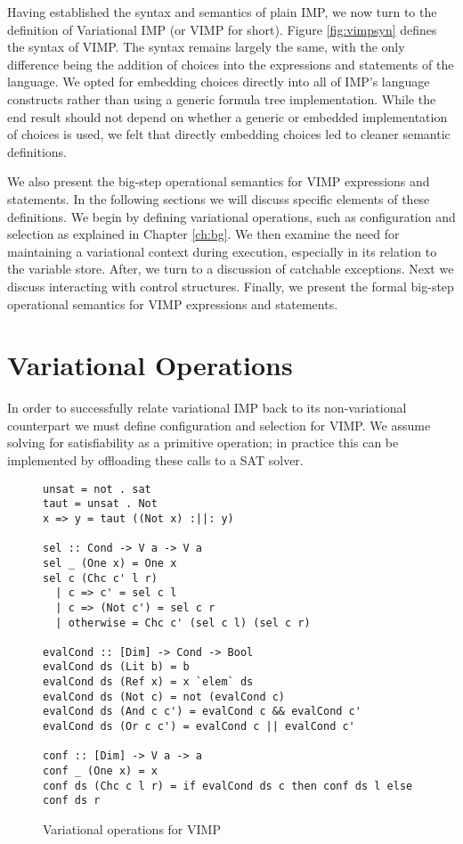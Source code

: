 \documentclass[12pt,oneside]{book}
\begin{document}
Having established the syntax and semantics of plain IMP, we now turn to the definition of Variational IMP (or VIMP for short).
Figure \ref{fig:vimpsyn} defines the syntax of VIMP. The syntax remains largely the same, with the only difference being the
addition of choices into the expressions and statements of the language. We opted for embedding choices directly into all of IMP's language constructs rather than using
a generic formula tree implementation. While the end result should not depend on whether a generic or embedded implementation of choices is
used, we felt that directly embedding choices led to cleaner semantic definitions.

We also present the big-step operational semantics for VIMP expressions and statements. In the following sections we will discuss specific elements of these definitions.
We begin by defining variational operations, such as configuration and selection as explained in Chapter \ref{ch:bg}. We then examine the need for maintaining a variational context during execution, especially in its relation to the variable store. After, we turn to a discussion of
catchable exceptions. Next we discuss interacting with control structures. Finally, we present the formal big-step operational semantics for VIMP expressions and statements.




\section{Variational Operations}

In order to successfully relate variational IMP back to its non-variational counterpart
we must define configuration and selection for VIMP. We assume solving for satisfiability
as a primitive operation; in practice this can be implemented by offloading these calls to
a SAT solver.

\begin{figure}
\begin{lstlisting}
unsat = not . sat
taut = unsat . Not
x => y = taut ((Not x) :||: y)

sel :: Cond -> V a -> V a
sel _ (One x) = One x
sel c (Chc c' l r)
  | c => c' = sel c l
  | c => (Not c') = sel c r
  | otherwise = Chc c' (sel c l) (sel c r)
  
evalCond :: [Dim] -> Cond -> Bool
evalCond ds (Lit b) = b
evalCond ds (Ref x) = x `elem` ds
evalCond ds (Not c) = not (evalCond c)
evalCond ds (And c c') = evalCond c && evalCond c'
evalCond ds (Or c c') = evalCond c || evalCond c'

conf :: [Dim] -> V a -> a
conf _ (One x) = x
conf ds (Chc c l r) = if evalCond ds c then conf ds l else conf ds r
\end{lstlisting}
\caption{Variational operations for VIMP}
\label{fig:varops}
\end{figure}
\end{document}
